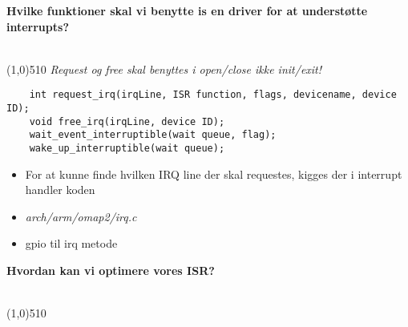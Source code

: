 \documentclass{paper}
\begin{document}
\begin{large}\textbf{Hvilke funktioner skal vi benytte is en driver for at underst\o tte interrupts?}\end{large}\\
\line(1,0){510}
\textit{Request og free skal benyttes i open/close ikke init/exit!}
\begin{lstlisting}
	int request_irq(irqLine, ISR function, flags, devicename, device ID);
	void free_irq(irqLine, device ID);
	wait_event_interruptible(wait queue, flag);
	wake_up_interruptible(wait queue);
\end{lstlisting}
\begin{itemize}
	\item For at kunne finde hvilken IRQ line der skal requestes, kigges der i interrupt handler koden
	\item \textit{arch/arm/omap2/irq.c}
	\item gpio til irq metode
\end{itemize}

\begin{large}\textbf{Hvordan kan vi optimere vores ISR?}\end{large}\\
\line(1,0){510}
\end{document}
